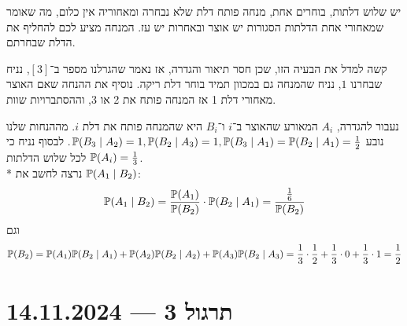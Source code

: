 \begin{example}
	יש שלוש דלתות, בוחרים אחת, מנחה פותח דלת שלא נבחרה ומאחוריה אין כלום, מה שאומר שמאחורי אחת הדלתות הסגורות יש אוצר ובאחרות יש עז.
	המנחה מציע לכם להחליף את הדלת שבחרתם.

	קשה למדל את הבעיה הזו, שכן חסר תיאור והגדרה, אז נאמר שהגרלנו מספר ב־$[3]$, נניח שבחרנו $1$, נניח שהמנחה גם במכוון תמיד בוחר דלת ריקה.
	נוסיף את ההנחה שאם האוצר מאחורי דלת 1 אז המנחה פותח את 2 או 3, וההסתברויות שוות.
	
	נעבור להגדרה, $A_i$ המאורע שהאוצר ב־$i$ ו־$B_i$ היא שהמנחה פותח את דלת $i$.
	מההנחות שלנו נובע $\mathbb{P}(B_3 \mid A_2) = 1, \mathbb{P}(B_2 \mid A_3) = 1, \mathbb{P}(B_3 \mid A_1) = \mathbb{P}(B_2 \mid A_1) = \frac{1}{2}$.
	לבסוף נניח כי $\mathbb{P}(A_i) = \frac{1}{3}$ לכל שלוש הדלתות. \\*
	נרצה לחשב את $\mathbb{P}(A_1 \mid B_2)$:
	\[
		\mathbb{P}(A_1 \mid B_2)
		= \frac{\mathbb{P}(A_1)}{\mathbb{P}(B_2)} \cdot \mathbb{P}(B_2 \mid A_1)
		= \frac{\frac{1}{6}}{\mathbb{P}(B_2)}
	\]
	וגם
	\[
		\mathbb{P}(B_2) = \mathbb{P}(A_1) \mathbb{P}(B_2 \mid A_1) + \mathbb{P}(A_2) \mathbb{P}(B_2 \mid A_2) + \mathbb{P}(A_3) \mathbb{P}(B_2 \mid A_3) = \frac{1}{3} \cdot \frac{1}{2} + \frac{1}{3} \cdot 0 + \frac{1}{3} \cdot 1 = \frac{1}{2}
	\]
\end{example}

\section{תרגול 3 --- 14.11.2024}

